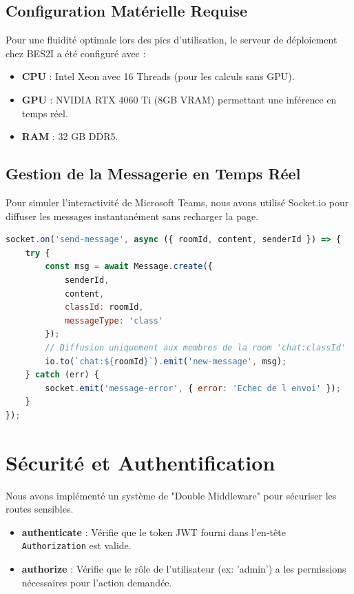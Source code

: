 \subsection{Configuration Matérielle Requise}
Pour une fluidité optimale lors des pics d'utilisation, le serveur de déploiement chez BES2I a été configuré avec :
\begin{itemize}
    \item \textbf{CPU} : Intel Xeon avec 16 Threads (pour les calculs sans GPU).
    \item \textbf{GPU} : NVIDIA RTX 4060 Ti (8GB VRAM) permettant une inférence en temps réel.
    \item \textbf{RAM} : 32 GB DDR5.
\end{itemize}

\subsection{Gestion de la Messagerie en Temps Réel}
Pour simuler l'interactivité de Microsoft Teams, nous avons utilisé Socket.io pour diffuser les messages instantanément sans recharger la page.

\begin{lstlisting}[language=JavaScript, caption=Gestionnaire de messages Socket.io]
socket.on('send-message', async ({ roomId, content, senderId }) => {
    try {
        const msg = await Message.create({
            senderId,
            content,
            classId: roomId,
            messageType: 'class'
        });
        // Diffusion uniquement aux membres de la room 'chat:classId'
        io.to(`chat:${roomId}`).emit('new-message', msg);
    } catch (err) {
        socket.emit('message-error', { error: 'Echec de l envoi' });
    }
});
\end{lstlisting}

\section{Sécurité et Authentification}
Nous avons implémenté un système de "Double Middleware" pour sécuriser les routes sensibles.
\begin{itemize}
    \item \textbf{authenticate} : Vérifie que le token JWT fourni dans l'en-tête \texttt{Authorization} est valide.
    \item \textbf{authorize} : Vérifie que le rôle de l'utilisateur (ex: 'admin') a les permissions nécessaires pour l'action demandée.
\end{itemize}

